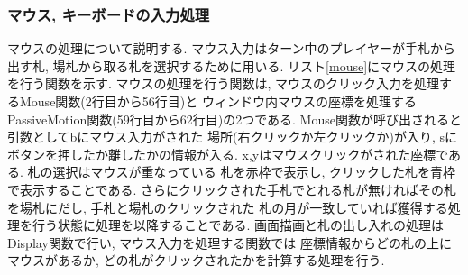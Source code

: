 \documentclass[a4j]{jarticle}
\begin{document}
    \subsubsection{マウス, キーボードの入力処理}
    マウスの処理について説明する. マウス入力はターン中のプレイヤーが手札から出す札, 場札から取る札を選択するために用いる.
    リスト\ref{mouse}にマウスの処理を行う関数を示す. マウスの処理を行う関数は, マウスのクリック入力を処理するMouse関数(2行目から56行目)と
    ウィンドウ内マウスの座標を処理するPassiveMotion関数(59行目から62行目)の2つである. Mouse関数が呼び出されると引数としてbにマウス入力がされた
    場所(右クリックか左クリックか)が入り, sにボタンを押したか離したかの情報が入る. x,yはマウスクリックがされた座標である. 札の選択はマウスが重なっている
    札を赤枠で表示し, クリックした札を青枠で表示することである. さらにクリックされた手札でとれる札が無ければその札を場札にだし, 手札と場札のクリックされた
    札の月が一致していれば獲得する処理を行う状態に処理を以降することである. 画面描画と札の出し入れの処理はDisplay関数で行い, マウス入力を処理する関数では
    座標情報からどの札の上にマウスがあるか, どの札がクリックされたかを計算する処理を行う. 
\end{document}

